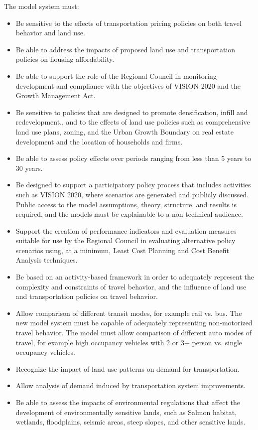 The model system must:
\begin{itemize}
\item   Be sensitive to the effects of transportation pricing policies on both travel behavior and land use.
\item   Be able to address the impacts of proposed land use and transportation policies on housing affordability.
\item   Be able to support the role of the Regional Council in monitoring development and compliance with the objectives of VISION 2020 and the Growth Management Act.
\item   Be sensitive to policies that are designed to promote densification, infill and redevelopment., and to the effects of land use policies such as comprehensive land use plans, zoning, and the Urban Growth Boundary on real estate development and the location of households and firms.
\item   Be able to assess policy effects over periods ranging from less than 5 years to 30 years.
\item   Be designed to support a participatory policy process that includes activities such as VISION 2020, where scenarios are generated and publicly discussed.  Public access to the model assumptions, theory, structure, and results is required, and the models must be explainable to a non-technical audience.
\item   Support the creation of performance indicators and evaluation measures suitable for use by the Regional Council in evaluating alternative policy scenarios using, at a minimum, Least Cost Planning and Cost Benefit Analysis techniques.
\item   Be based on an activity-based framework in order to adequately represent the complexity and constraints of travel behavior, and the influence of land use and transportation policies on travel behavior.
\item   Allow comparison of different transit modes, for example rail vs. bus.  The new model system must be capable of adequately representing non-motorized travel behavior.  The model must allow comparison of different auto modes of travel, for example high occupancy vehicles with 2 or 3+ person vs. single occupancy vehicles.
\item   Recognize the impact of land use patterns on demand for transportation.
\item   Allow analysis of demand induced by transportation system improvements.
\item   Be able to assess the impacts of environmental regulations that affect the development of environmentally sensitive lands, such as Salmon habitat, wetlands, floodplains, seismic areas, steep slopes, and other sensitive lands.

\end{itemize}
